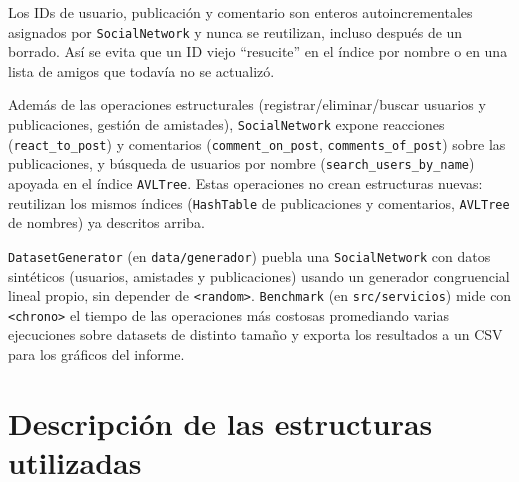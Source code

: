 \documentclass[11pt,a4paper]{article}
\begin{document}
Los IDs de usuario, publicación y comentario son enteros
autoincrementales asignados por \texttt{SocialNetwork} y nunca se
reutilizan, incluso después de un borrado. Así se evita que un ID viejo
``resucite'' en el índice por nombre o en una lista de amigos que
todavía no se actualizó.

Además de las operaciones estructurales (registrar/eliminar/buscar
usuarios y publicaciones, gestión de amistades), \texttt{SocialNetwork}
expone reacciones (\texttt{react\_to\_post}) y comentarios
(\texttt{comment\_on\_post}, \texttt{comments\_of\_post}) sobre las
publicaciones, y búsqueda de usuarios por nombre
(\texttt{search\_users\_by\_name}) apoyada en el índice \texttt{AVLTree}.
Estas operaciones no crean estructuras nuevas: reutilizan los mismos
índices (\texttt{HashTable} de publicaciones y comentarios, \texttt{AVLTree}
de nombres) ya descritos arriba.

\texttt{DatasetGenerator} (en \texttt{data/generador}) puebla una
\texttt{SocialNetwork} con datos sintéticos (usuarios, amistades y
publicaciones) usando un generador congruencial lineal propio, sin
depender de \texttt{<random>}. \texttt{Benchmark} (en
\texttt{src/servicios}) mide con \texttt{<chrono>} el tiempo de las
operaciones más costosas promediando varias ejecuciones sobre datasets de
distinto tamaño y exporta los resultados a un CSV para los gráficos del
informe.

\section{Descripción de las estructuras utilizadas}
\end{document}
